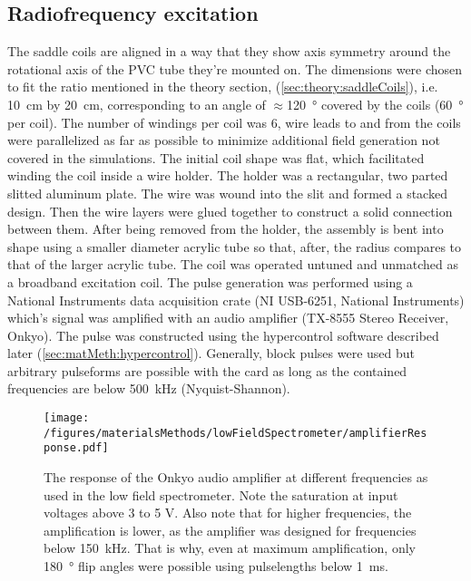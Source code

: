         \subsection{Radiofrequency excitation}
        \label{sec:matMeth:rfPulses}
        The saddle coils are aligned in a way that they show axis symmetry around the rotational axis of the PVC tube they're mounted on. The dimensions were chosen to fit the ratio mentioned in the theory section, (\ref{sec:theory:saddleCoils}), i.e. \SI{10}{\cm} by \SI{20}{\cm}, corresponding to an angle of $\approx$\SI{120}{\degree} covered by the coils (\SI{60}{\degree} per coil). The number of windings per coil was 6, wire leads to and from the coils were parallelized as far as possible to minimize additional field generation not covered in the simulations. 
        The initial coil shape was flat, which facilitated winding the coil inside a wire holder. The holder was a rectangular, two parted slitted aluminum plate. The wire was wound into the slit and formed a stacked design. Then the wire layers were glued together to construct a solid connection between them. After being removed from the holder, the assembly is bent into shape using a smaller diameter acrylic tube so that, after, the radius compares to that of the larger acrylic tube. The coil was operated untuned and unmatched as a broadband excitation coil. The pulse generation was performed using a National Instruments data acquisition crate (NI USB-6251, National Instruments) which's signal was amplified with an audio amplifier (TX-8555 Stereo Receiver, Onkyo).
            The pulse was constructed using the hypercontrol software described later (\ref{sec:matMeth:hypercontrol}). Generally, block pulses were used but arbitrary pulseforms are possible with the card as long as the contained frequencies are below \SI{500}{\kilo\hertz} (Nyquist-Shannon). 
            \begin{figure}
                \label{fig:matMeth:amplifierResponse}
                \centering
                \texttt{[image: /figures/materialsMethods/lowFieldSpectrometer/amplifierResponse.pdf]}
            \caption[Amplifier response]{The response of the Onkyo audio amplifier at different frequencies as used in the low field spectrometer. Note the saturation at input voltages above 3 to 5 \si{\volt}. Also note that for higher frequencies, the amplification is lower, as the amplifier was designed for frequencies below \SI{150}{\kilo\hertz}. That is why, even at maximum amplification, only \SI{180}{\degree} flip angles were possible using pulselengths below \SI{1}{\milli\second}.}
            \end{figure}
